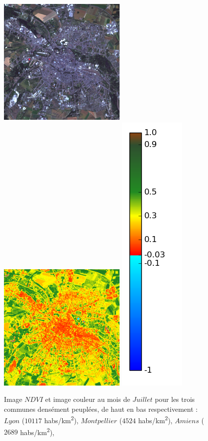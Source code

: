 \documentclass{book}
\begin{document}
\begin{figure}[H]
{}
\centerline{
\includegraphics[scale=0.6]{../3_ndvi/images/Amiens/07_rgb.png}
\includegraphics[scale=0.6]{../3_ndvi/images/Amiens/07_ndvi.png}
\includegraphics[scale=0.3]{../3_ndvi/images/colormap.png}
}
\caption{Image $NDVI$ et image couleur au mois de $Juillet$ pour les trois communes densément peuplées, de haut en bas respectivement :
$Lyon$ ($10117$ habs/km\textsuperscript{2}),
$Montpellier$ ($4524$ habs/km\textsuperscript{2}),
$Amiens$ ($2689$ habs/km\textsuperscript{2}),
}
\label{ndvi_cat1}
\end{figure}
\clearpage
\end{document}
